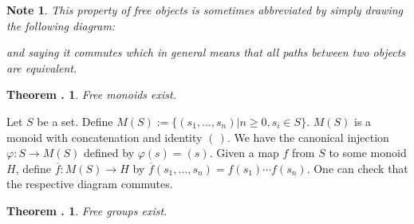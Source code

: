 \documentclass[twoside]{report}
\newcounter{Lecture}
\theoremstyle{myts}
\newcounter{c}[Lecture]
\newtheorem{thm}[c]{Theorem \arabic{Lecture}.}
\newtheorem*{nte}{Note}
\newcounter{ex}[Lecture]
\newenvironment{prf}{
  \noindent\begin{mdframed}[style=prf]}{\end{mdframed} \vspace{1em}
}
\begin{document}
\begin{nte}
  This property of free objects is sometimes abbreviated by simply drawing the following diagram:
  \begin{center}
  \end{center}
  and saying it \emph{commutes} which in general means that all paths between two objects are equivalent.
\end{nte}

\begin{thm}
  Free monoids exist.
\end{thm}

\begin{prf}
  Let $S$ be a set. Define \( M(S) := \{ (s_1, \ldots , s_n ) | n\geq 0, s_i\in S \} \). $M(S)$ is a monoid with concatenation and identity $ ( \, ) $. We have the canonical injection \( \varphi : S \to M(S) \) defined by \( \varphi(s) = (s) \). Given a map $f$ from $S$ to some monoid $H$, define \( \overline{f}:M(S)\to H \) by \( \overline{f}(s_1, \ldots , s_n ) = f(s_1) \cdots f(s_n) \). One can check that the respective diagram commutes.
\end{prf}

\begin{thm}
  Free groups exist.
\end{thm}
\end{document}
